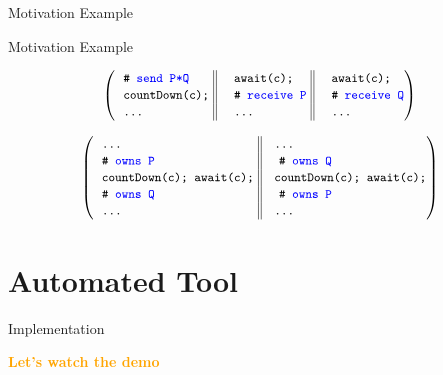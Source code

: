\documentclass[11pt]{beamer}
\newcommand\orange[1]{\textcolor{orange}{\textbf{#1}}}
\begin{document}
\begin{frame}{Motivation Example}

\end{frame}

\begin{frame}{Motivation Example}
\begin{center}
\[
{
\left(
\begin{tabular}{ l@{\extracolsep{\fill}} || 
                 l@{\extracolsep{\fill}} || 
                 l@{\extracolsep{\fill}} }
\BCOMMENT{\SPEC{send P*Q}} ~&~ \code{await(c);} ~&~ \code{await(c);}\\
\code{countDown(c);} ~&~ \BCOMMENT{\SPEC{receive P}} ~&~ \BCOMMENT{\SPEC{receive Q}}\\
\code{\ldots} ~&~ \code{\ldots} ~&~ \code{\ldots}\\
\end{tabular}\right)
}
\]
\end{center}


\pause

  \begin{center}
\[
{
\left(
\begin{tabular}{ l@{\extracolsep{\fill}}  || l@{\extracolsep{\fill}} }
\code{\ldots} ~&~\code{\ldots}\\
\BCOMMENT{\SPEC{owns P}} ~&~ \BCOMMENT{\SPEC{owns Q}}\\
\code{countDown(c);~await(c);} ~&~\code{countDown(c);~await(c);}\\
\BCOMMENT{\SPEC{owns Q}} ~&~ \BCOMMENT{\SPEC{owns P}}\\
\code{\ldots} ~&~\code{\ldots}\\
\end{tabular}\right)
}
\]
\end{center}
\end{frame}





\section{Automated Tool}
\begin{frame}{Implementation}
  \begin{center}
    \Large \orange{Let's watch the demo}
  \end{center}
\end{frame}
\end{document}
